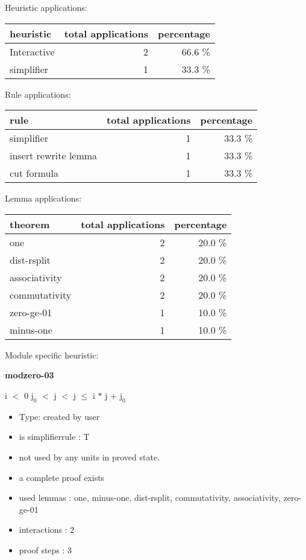 \documentclass[a4paper]{article}
\begin{document}
\medskip


Heuristic applications:

\begin{supertabular}{l|r|r}
heuristic	& total applications & percentage \\ \hline
Interactive & 2 & 66.6 \% \\
simplifier & 1 & 33.3 \% \\

\end{supertabular}

Rule applications:

\begin{supertabular}{l|r|r}
rule	        & total applications & percentage \\ \hline
simplifier & 1 & 33.3 \% \\
insert rewrite lemma & 1 & 33.3 \% \\
cut formula & 1 & 33.3 \% \\

\end{supertabular}

Lemma applications:

\begin{supertabular}{l|r|r}
theorem	        & total applications & percentage \\ \hline
one & 2 & 20.0 \% \\
dist-rsplit & 2 & 20.0 \% \\
associativity & 2 & 20.0 \% \\
commutativity & 2 & 20.0 \% \\
zero-ge-01 & 1 & 10.0 \% \\
minus-one & 1 & 10.0 \% \\

\end{supertabular}

Module specific heuristic:

\pagebreak

{\LARGE\bf modzero-03}\label{lemma-modzero-03}

\medskip

 \Fol i $<$ 0 \And $\mbox{j}_{0}$ $<$ j  $<$ j \Imp {} $\le$ i $*$ j + $\mbox{j}_{0}$

\begin{itemize}

\item Type: created by user

\item is simplifierrule : T
\item not used by any units in proved state.
\item       a complete proof exists
\item       used lemmas  : one, minus-one, dist-rsplit, commutativity, associativity, zero-ge-01
\item       interactions : 2
\item       proof steps  : 3
\end{itemize}
\end{document}
